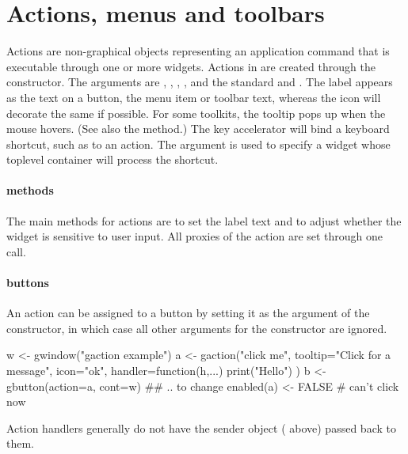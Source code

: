 \section{Actions, menus and toolbars}
\label{sec:gWidgets-acti-menus-toolb}


Actions are non-graphical objects representing an application command
that is executable through one or more widgets. Actions in
 are created through the 
constructor. The arguments are ,
, ,
,  and the
standard  and
. The label appears as the text on a button,
the menu item or toolbar text, whereas the icon will decorate the same
if possible. For some toolkits, the tooltip pops up when the mouse
hovers.  (See also the  method.) The key
accelerator will bind a keyboard shortcut, such as  to
an action. The  argument is used to specify a widget
whose toplevel container will process the shortcut.

\paragraph{methods}
The main methods for actions are  to
set the label text and  to adjust
whether the widget is sensitive to user input. All proxies of the
action are set through one call.

\paragraph{buttons}
An action can be assigned to a button by setting it as the
 argument of the  constructor,
in which case all other arguments for the constructor are ignored.

\begin{Schunk}
\begin{Sinput}
 w <- gwindow("gaction example")
 a <- gaction("click me", tooltip="Click for a message", 
              icon="ok", 
              handler=function(h,...) {
                print("Hello")
                })
 b <- gbutton(action=a, cont=w)
 ## .. to change
 enabled(a) <- FALSE                     # can't click now
\end{Sinput}
\end{Schunk}
Action handlers generally do not have the sender object ( above)
passed back to them.

